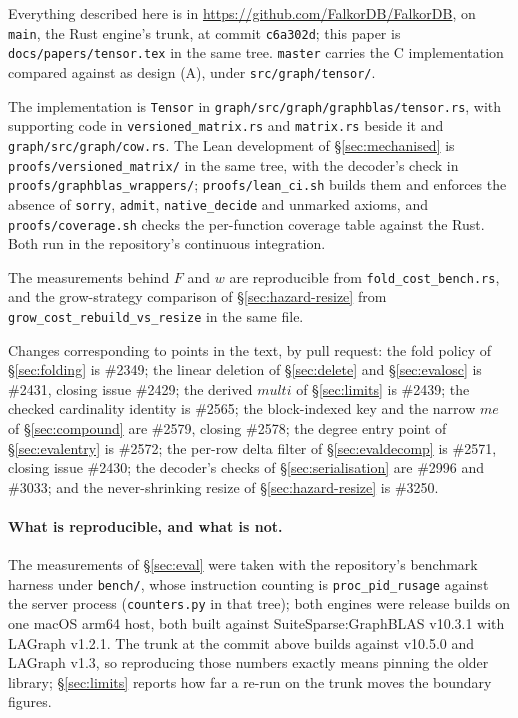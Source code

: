 \documentclass[11pt,a4paper]{article}
\theoremstyle{plain}
\theoremstyle{definition}
\theoremstyle{remark}
\begin{document}
Everything described here is in \url{https://github.com/FalkorDB/FalkorDB}, on
\texttt{main}, the Rust engine's trunk, at commit \texttt{c6a302d}; this paper
is \texttt{docs/papers/tensor.tex} in the same tree. \texttt{master} carries
the C implementation compared against as design (A), under
\texttt{src/graph/tensor/}.

The implementation is \texttt{Tensor} in
\texttt{graph/src/graph/graphblas/tensor.rs}, with supporting code in
\texttt{versioned\_matrix.rs} and \texttt{matrix.rs} beside it and
\texttt{graph/src/graph/cow.rs}. The Lean development of \S\ref{sec:mechanised}
is \texttt{proofs/versioned\_matrix/} in the same tree, with the decoder's check
in \texttt{proofs/graphblas\_wrappers/}; \texttt{proofs/lean\_ci.sh} builds them
and enforces the absence of \texttt{sorry}, \texttt{admit},
\texttt{native\_decide} and unmarked axioms, and \texttt{proofs/coverage.sh}
checks the per-function coverage table against the Rust. Both run in the
repository's continuous integration.

The measurements behind $F$ and $w$ are reproducible from
\texttt{fold\_cost\_bench.rs}, and the grow-strategy comparison of
\S\ref{sec:hazard-resize} from \texttt{grow\_cost\_rebuild\_vs\_resize} in the
same file.

Changes corresponding to points in the text, by pull request: the fold policy
of \S\ref{sec:folding} is \#2349; the linear deletion of \S\ref{sec:delete}
and \S\ref{sec:evalosc} is \#2431, closing issue \#2429; the derived
$\textit{multi}$ of \S\ref{sec:limits} is \#2439; the checked cardinality
identity is \#2565; the block-indexed key and the narrow $me$ of
\S\ref{sec:compound} are \#2579, closing \#2578; the degree entry point of
\S\ref{sec:evalentry} is \#2572; the per-row delta filter of
\S\ref{sec:evaldecomp} is \#2571, closing issue \#2430; the decoder's checks of
\S\ref{sec:serialisation} are \#2996 and \#3033; and the never-shrinking
resize of \S\ref{sec:hazard-resize} is \#3250.

\paragraph{What is reproducible, and what is not.} The measurements of
\S\ref{sec:eval} were taken with the repository's benchmark harness under
\texttt{bench/}, whose instruction counting is \texttt{proc\_pid\_rusage}
against the server process (\texttt{counters.py} in that tree); both engines
were release builds on one macOS arm64 host, both built against
SuiteSparse:GraphBLAS v10.3.1 with LAGraph v1.2.1. The trunk at the commit
above builds against v10.5.0 and LAGraph v1.3, so reproducing those numbers
exactly means pinning the older library; \S\ref{sec:limits} reports how far a
re-run on the trunk moves the boundary figures.
\end{document}
